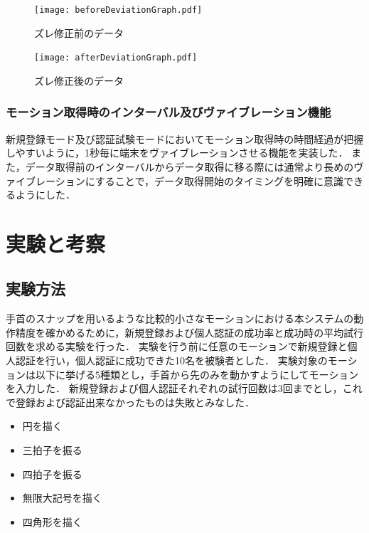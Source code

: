 \documentclass[11pt]{jreport}
\begin{document}
        \begin{figure}[btp]
            \begin{minipage}{0.5\hsize}
                \begin{center}
                    \texttt{[image: beforeDeviationGraph.pdf]}
                \end{center}
                \caption{ズレ修正前のデータ}
                \label{beforeDeviationDataGraph}
            \end{minipage}
            \begin{minipage}{0.5\hsize}
                \begin{center}
                    \texttt{[image: afterDeviationGraph.pdf]}
                \end{center}
                \caption{ズレ修正後のデータ}
                \label{afterDeviationDataGraph}
            \end{minipage}
        \end{figure}

        \subsection{モーション取得時のインターバル及びヴァイブレーション機能}
        新規登録モード及び認証試験モードにおいてモーション取得時の時間経過が把握しやすいように，1秒毎に端末をヴァイブレーションさせる機能を実装した．
        また，データ取得前のインターバルからデータ取得に移る際には通常より長めのヴァイブレーションにすることで，データ取得開始のタイミングを明確に意識できるようにした．

\chapter{実験と考察}
    \section{実験方法}
    手首のスナップを用いるような比較的小さなモーションにおける本システムの動作精度を確かめるために，新規登録および個人認証の成功率と成功時の平均試行回数を求める実験を行った．
    実験を行う前に任意のモーションで新規登録と個人認証を行い，個人認証に成功できた10名を被験者とした．
    実験対象のモーションは以下に挙げる5種類とし，手首から先のみを動かすようにしてモーションを入力した．
    新規登録および個人認証それぞれの試行回数は3回までとし，これで登録および認証出来なかったものは失敗とみなした．

    \begin{itemize}
        \item 円を描く
        \item 三拍子を振る
        \item 四拍子を振る
        \item 無限大記号を描く
        \item 四角形を描く
    \end{itemize}
\end{document}
